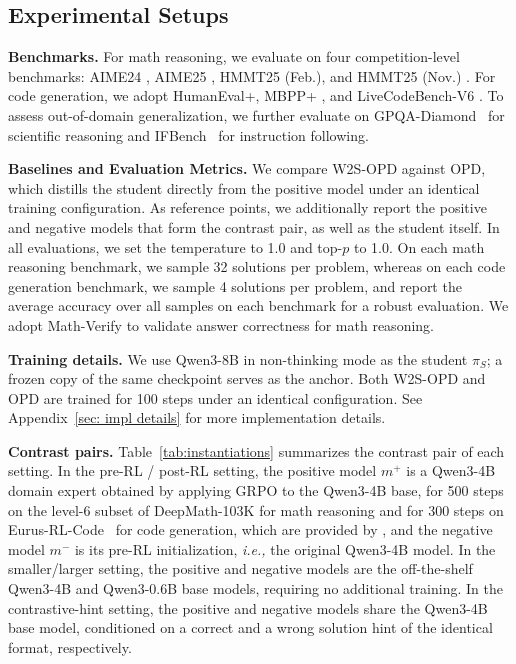 \documentclass{article}
\newcommand{\ie}{\textit{i.e., }}
\newcommand\ours{W2S-OPD\xspace}
\begin{document}
\subsection{Experimental Setups}
\noindent\textbf{Benchmarks.}
For math reasoning, we evaluate on four competition-level benchmarks: AIME24 \citep{aimo_validation_aime}, AIME25 \citep{aime25}, HMMT25 (Feb.), and HMMT25 (Nov.) \citep{balunovic2025matharena}. For code generation, we adopt HumanEval+, MBPP+ \citep{liu2023your}, and LiveCodeBench-V6 \citep{jain2025livecodebench}. To assess out-of-domain generalization, we further evaluate on GPQA-Diamond~\citep{rein2023gpqa} for scientific reasoning and IFBench~\citep{pyatkin2026generalizing} for instruction following.

\noindent\textbf{Baselines and Evaluation Metrics.}
We compare \ours against OPD, which distills the student directly from the positive model 
under an identical training configuration. As reference points, we additionally report the positive and negative models that form the contrast pair, as well as the student itself. In all evaluations, we set the temperature to 1.0 and top-$p$ to 1.0. On each math reasoning benchmark, we sample 32 solutions per problem, whereas on each code generation benchmark, we sample 4 solutions per problem, and report the average accuracy over all samples on each benchmark for a robust evaluation. We adopt Math-Verify to validate answer correctness for math reasoning.

\noindent\textbf{Training details.}
We use Qwen3-8B \citep{yang2025qwen3} in non-thinking mode as the student $\pi_{S}$; a frozen copy of the same checkpoint serves as the anchor. Both \ours and OPD are trained for 100 steps under an identical configuration. See Appendix~\ref{sec: impl details} for more implementation details.

\noindent\textbf{Contrast pairs.}
Table~\ref{tab:instantiations} summarizes the contrast pair of each setting. In the pre-RL / post-RL setting, the positive model $m^{+}$ is a Qwen3-4B domain expert obtained by applying GRPO \citep{shao2024grpo} to the Qwen3-4B base, for 500 steps on the level-6 subset of DeepMath-103K \citep{he2025deepmath} for math reasoning and for 300 steps on Eurus-RL-Code~\citep{cui2025process} for code generation, which are provided by \citep{yang2026learning}, and the negative model $m^{-}$ is its pre-RL initialization, \ie the original Qwen3-4B model. In the smaller/larger setting, the positive and negative models are the off-the-shelf Qwen3-4B and Qwen3-0.6B base models, requiring no additional training. In the contrastive-hint setting, the positive and negative models share the Qwen3-4B base model, conditioned on a correct and a wrong solution hint of the identical format, respectively.
\end{document}
